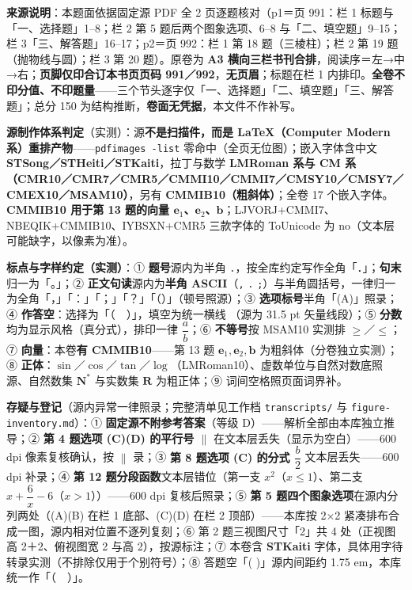 


\begin{gktip}
\textbf{来源说明}：本题面依据固定源 PDF 全 2 页逐题核对（p1＝页 991：栏 1 标题与「一、选择题」1–8；栏 2 第 5 题后两个图象选项、6–8 与「二、填空题」9–15；栏 3「三、解答题」16–17；p2＝页 992：栏 1 第 18 题（三棱柱）；栏 2 第 19 题（抛物线与圆）；栏 3 第 20 题）。原卷为 \textbf{A3 横向三栏书刊合排}，阅读序＝左→中→右；\textbf{页脚仅印合订本书页页码 991／992}，\textbf{无页眉}；标题在栏 1 内排印。\textbf{全卷不印分值、不印题量}——三个节头逐字仅「一、选择题」「二、填空题」「三、解答题」；总分 150 为结构推断，\textbf{卷面无凭据}，本文件不作补写。

\textbf{源制作体系判定}（实测）：源\textbf{不是扫描件，而是 LaTeX（Computer Modern 系）重排产物}——\texttt{pdfimages -list} 零命中（全页无位图）；嵌入字体含中文 \textbf{STSong／STHeiti／STKaiti}，拉丁与数学 \textbf{LMRoman 系与 CM 系（CMR10／CMR7／CMR5／CMMI10／CMMI7／CMSY10／CMSY7／CMEX10／MSAM10）}，另有 \textbf{CMMIB10（粗斜体）}；全卷 17 个嵌入字体。\textbf{CMMIB10 用于第 13 题的向量 \(\boldsymbol{e}_1\)、\(\boldsymbol{e}_2\)、\(\boldsymbol{b}\)}；LJVORJ+CMMI7、NBEQIK+CMMIB10、IYBSXN+CMR5 三款字体的 ToUnicode 为 no（文本层可能缺字，以像素为准）。

\textbf{标点与字样约定（实测）}：① \textbf{题号}源内为半角 \texttt{.}，按全库约定写作全角「．」；\textbf{句末}归一为「。」；② \textbf{正文句读}源内为\textbf{半角 ASCII}（\texttt{,} \texttt{.} \texttt{;}）与半角圆括号，一律归一为全角「，」「：」「；」「？」「（）」（顿号照源）；③ \textbf{选项标号}半角「(A)」照录；④ \textbf{作答空}：选择为「（　）」，填空为统一横线 \texttt{\gkblank{}}（源为 31.5 pt 矢量线段）；⑤ \textbf{分数}均为显示风格（真分式），排印一律 \(\dfrac{a}{b}\)；⑥ \textbf{不等号}按 MSAM10 实测排 \(\geqslant\)／\(\leqslant\)；⑦ \textbf{向量}：本卷\textbf{有 CMMIB10}——第 13 题 \(\boldsymbol{e}_1,\boldsymbol{e}_2,\boldsymbol{b}\) 为粗斜体（分卷独立实测）；⑧ \textbf{正体}：\(\sin\)／\(\cos\)／\(\tan\)／\(\log\)（LMRoman10）、虚数单位与自然对数底照源、自然数集 \(\mathbf{N}^*\) 与实数集 \(\mathbf{R}\) 为粗正体；⑨ 词间空格照页面词界补。

\textbf{存疑与登记}（源内异常一律照录；完整清单见工作档 \texttt{transcripts/} 与 \texttt{figure-inventory.md}）：① \textbf{固定源不附参考答案}（等级 D）——解析全部由本库独立推导；② \textbf{第 4 题选项 (C)(D) 的平行号 $\parallel$} 在文本层丢失（显示为空白）——600 dpi 像素复核确认，按 \(\parallel\) 录；③ \textbf{第 8 题选项 (C) 的分式 \(\dfrac{b}{2}\)} 文本层丢失——600 dpi 补录；④ \textbf{第 12 题分段函数}文本层错位（第一支 \(x^2\)（\(x\leqslant1\)）、第二支 \(x+\dfrac{6}{x}-6\)（\(x>1\)））——600 dpi 复核后照录；⑤ \textbf{第 5 题四个图象选项}在源内分列两处（(A)(B) 在栏 1 底部、(C)(D) 在栏 2 顶部）——本库按 2×2 紧凑排布合成一图，源内相对位置不逐列复刻；⑥ 第 2 题三视图尺寸「2」共 4 处（正视图高 2＋2、俯视图宽 2 与高 2），按源标注；⑦ 本卷含 \textbf{STKaiti} 字体，具体用字待转录实测（不排除仅用于个别符号）；⑧ 答题空「( )」源内间距约 1.75 em，本库统一作「（　）」。
\end{gktip}


